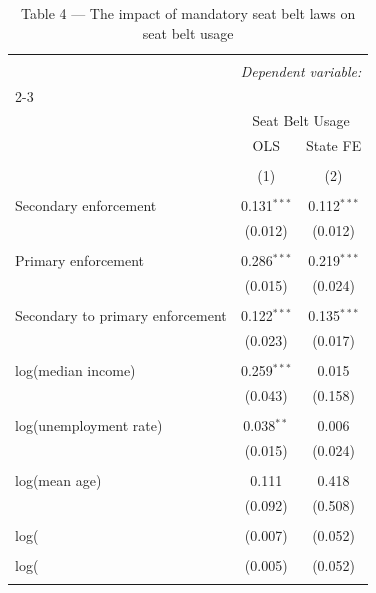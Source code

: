 
\begin{table}[!htbp] \centering 
  \caption{Table 4 --- The impact of mandatory seat belt laws on seat belt usage} 
  \label{} 
\begin{tabular}{@{\extracolsep{5pt}}lcc} 
\\[-1.8ex]\hline 
\hline \\[-1.8ex] 
 & \multicolumn{2}{c}{\textit{Dependent variable:}} \\ 
\cline{2-3} 
\\[-1.8ex] & \multicolumn{2}{c}{Seat Belt Usage} \\ 
 & OLS & State FE \\ 
\\[-1.8ex] & (1) & (2)\\ 
\hline \\[-1.8ex] 
 Secondary enforcement & 0.131$^{***}$ & 0.112$^{***}$ \\ 
  & (0.012) & (0.012) \\ 
  & & \\ 
 Primary enforcement & 0.286$^{***}$ & 0.219$^{***}$ \\ 
  & (0.015) & (0.024) \\ 
  & & \\ 
 Secondary to primary enforcement & 0.122$^{***}$ & 0.135$^{***}$ \\ 
  & (0.023) & (0.017) \\ 
  & & \\ 
 log(median income) & 0.259$^{***}$ & 0.015 \\ 
  & (0.043) & (0.158) \\ 
  & & \\ 
 log(unemployment rate) & 0.038$^{**}$ & 0.006 \\ 
  & (0.015) & (0.024) \\ 
  & & \\ 
 log(mean age) & 0.111 & 0.418 \\ 
  & (0.092) & (0.508) \\ 
  & & \\ 
 log(%
  & (0.007) & (0.052) \\ 
  & & \\ 
 log(%
  & (0.005) & (0.052) \\ 
  & & \\ 

\end{tabular}
\end{table}
